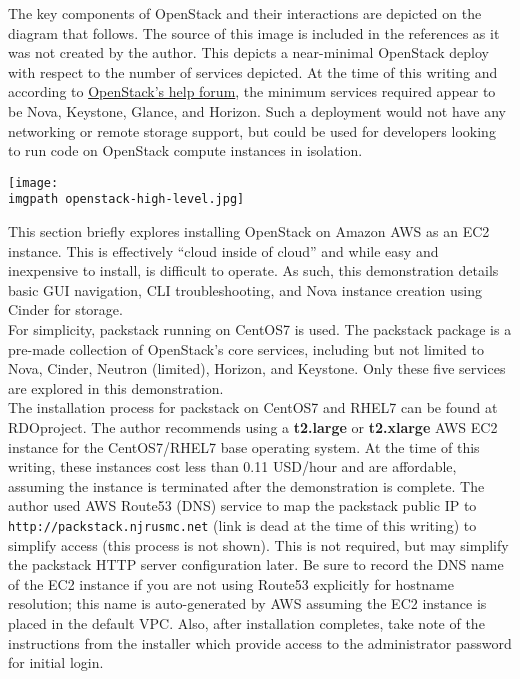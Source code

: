 The key components of OpenStack and their interactions are depicted on the
diagram that follows. The source of this image is included in the references as it
was not created by the author. This depicts a near-minimal OpenStack deploy
with respect to the number of services depicted. At the time of this writing
and according to
\href{https://ask.openstack.org/en/question/63268/installing-minimum-services-using-devstack/}{OpenStack’s help forum},
the minimum services required appear to be Nova, Keystone, Glance, and
Horizon. Such a deployment would not have any networking or remote storage
support, but could be used for developers looking to run code on OpenStack
compute instances in isolation.

    \begin{minipage}[t]{\linewidth}
	  \centering
      \texttt{[image: \\imgpath openstack-high-level.jpg]}
    \end{minipage}

This section briefly explores installing OpenStack on Amazon AWS as an EC2
instance. This is effectively ``cloud inside of cloud'' and while easy and
inexpensive to install, is difficult to operate. As such, this demonstration
details basic GUI navigation, CLI troubleshooting, and Nova instance creation
using Cinder for storage. \\

For simplicity, packstack running on CentOS7 is used. The packstack package is
a pre-made collection of OpenStack’s core services, including but not limited
to Nova, Cinder, Neutron (limited), Horizon, and Keystone. Only these five
services are explored in this demonstration. \\

The installation process for packstack on CentOS7 and RHEL7 can be found at
RDOproject. The author recommends using a \textbf{t2.large} or
\textbf{t2.xlarge} AWS EC2 instance for the CentOS7/RHEL7 base operating
system. At the time of this writing, these instances cost less than 0.11
USD/hour and are affordable, assuming the instance is terminated after the
demonstration is complete. The author used AWS Route53 (DNS) service to map
the packstack public IP to \verb|http://packstack.njrusmc.net| (link is dead
at the time of this writing) to simplify access (this process is not shown).
This is not required, but may simplify the packstack HTTP server configuration
later. Be sure to record the DNS name of the EC2 instance if you are not using
Route53 explicitly for hostname resolution; this name is auto-generated by AWS
assuming the EC2 instance is placed in the default VPC\@. Also, after
installation completes, take note of the instructions from the installer which
provide access to the administrator password for initial login. \\

